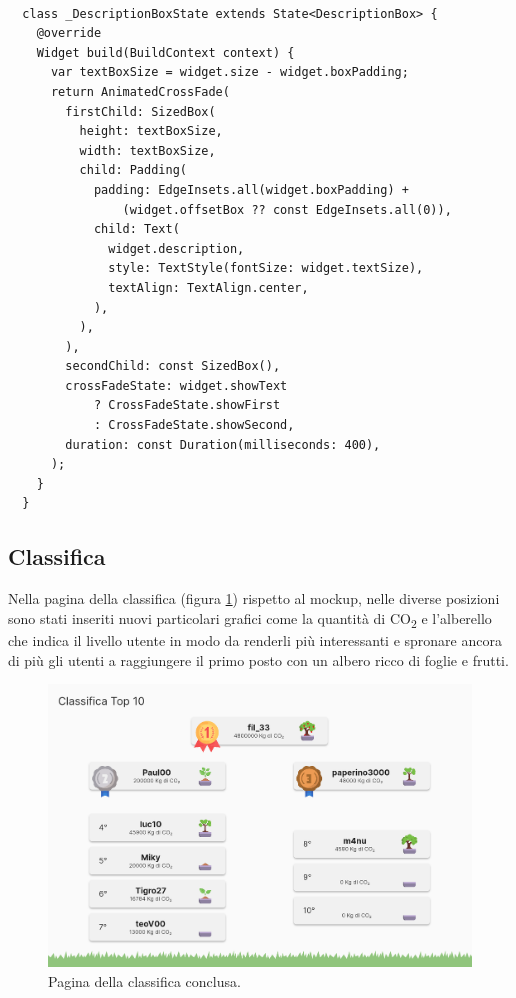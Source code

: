 \begin{lstlisting}[style=FlutterStyle, caption={Stato della classe DescriptionBox che genera il widget della descrizione del contatore}, label={lst:descrBoxStat}]

  class _DescriptionBoxState extends State<DescriptionBox> {
    @override
    Widget build(BuildContext context) {
      var textBoxSize = widget.size - widget.boxPadding;
      return AnimatedCrossFade(
        firstChild: SizedBox(
          height: textBoxSize,
          width: textBoxSize,
          child: Padding(
            padding: EdgeInsets.all(widget.boxPadding) +
                (widget.offsetBox ?? const EdgeInsets.all(0)),
            child: Text(
              widget.description,
              style: TextStyle(fontSize: widget.textSize),
              textAlign: TextAlign.center,
            ),
          ),
        ),
        secondChild: const SizedBox(),
        crossFadeState: widget.showText
            ? CrossFadeState.showFirst
            : CrossFadeState.showSecond,
        duration: const Duration(milliseconds: 400),
      );
    }
  }
\end{lstlisting}
%
%
\subsection{Classifica}
Nella pagina della classifica (figura \ref{fig:top10screen}) rispetto al mockup, nelle diverse posizioni sono stati inseriti nuovi particolari grafici come la quantità di CO\textsubscript{2} e l'alberello che indica il livello utente in modo da renderli più interessanti e spronare ancora di più gli utenti a raggiungere il primo posto con un albero ricco di foglie e frutti.
\begin{figure}[h]
  \centering
  \includegraphics[width=\textwidth]{img/totem/screenshot/top10screen.png}
  \caption{Pagina della classifica conclusa.}
  \label{fig:top10screen}
\end{figure}

